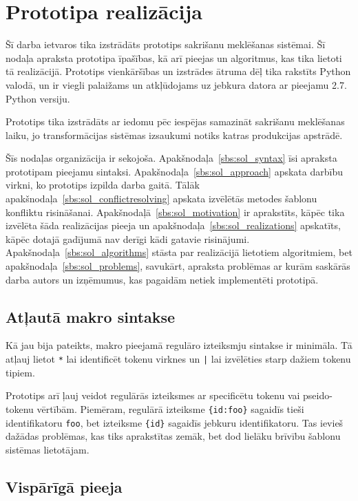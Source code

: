 \section{\label{s:solution}Prototipa realizācija}

Šī darba ietvaros tika izstrādāts prototips sakrišanu meklēšanas sistēmai. Šī nodaļa apraksta prototipa īpašības, kā arī pieejas un algoritmus, kas tika lietoti tā realizācijā. Prototips vienkāršības un izstrādes ātruma dēļ tika rakstīts Python valodā, un ir viegli palaižams un atkļūdojams uz jebkura datora ar pieejamu 2.7. Python versiju.

Prototips tika izstrādāts ar iedomu pēc iespējas samazināt sakrišanu meklēšanas laiku, jo transformācijas sistēmas izsaukumi notiks katras produkcijas apstrādē.

Šīs nodaļas organizācija ir sekojoša. Apakšnodaļa~\ref{sbs:sol_syntax} īsi apraksta prototipam pieejamu sintaksi. Apakšnodaļa~\ref{sbs:sol_approach} apskata darbību virkni, ko prototips izpilda darba gaitā. Tālāk apakšnodaļa~\ref{sbs:sol_conflictresolving} apskata izvēlētās metodes šablonu konfliktu risināšanai. Apakšnodaļā~\ref{sbs:sol_motivation} ir aprakstīts, kāpēc tika izvēlēta šāda realizācijas pieeja un apakšnodaļa~\ref{sbs:sol_realizations} apskatīts, kāpēc dotajā gadījumā nav derīgi kādi gatavie risinājumi. Apakšnodaļa~\ref{sbs:sol_algorithms} stāsta par realizācijā lietotiem algoritmiem, bet apakšnodaļa~\ref{sbs:sol_problems}, savukārt, apraksta problēmas ar kurām saskārās darba autors un izņēmumus, kas pagaidām netiek implementēti prototipā.

\subsection{\label{sbs:sol_syntax}Atļautā makro sintakse}

Kā jau bija pateikts, makro pieejamā regulāro izteiksmju sintakse ir minimāla. Tā atļauj lietot \verb|*| lai identificēt tokenu virknes un \verb/|/ lai izvēlēties starp dažiem tokenu tipiem.

Prototips arī ļauj veidot regulārās izteiksmes ar specificētu tokenu vai pseido-tokenu vērtībām. Piemēram, regulārā izteiksme \verb|{id:foo}| sagaidīs tieši identifikatoru \verb|foo|, bet izteiksme \verb|{id}| sagaidīs jebkuru identifikatoru. Tas ievieš dažādas problēmas, kas tiks aprakstītas zemāk, bet dod lielāku brīvību šablonu sistēmas lietotājam.

\subsection{\label{sbs:sol_approach}Vispārīgā pieeja}

